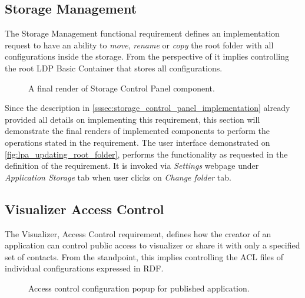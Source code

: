 \subsection{Storage Management}

The Storage Management functional requirement defines an implementation request to have an ability to \textit{move}, \textit{rename} or \textit{copy} the root folder with all configurations inside the storage. From the perspective of \lpas{} it implies controlling the root LDP Basic Container that stores all configurations.

\begin{figure}[h]
\centering
{}
\caption{A final render of Storage Control Panel component.}
\label{fig:lpa_updating_root_folder}
\end{figure}

Since the description in \autoref{sssec:storage_control_panel_implementation} already provided all details on implementing this requirement, this section will demonstrate the final renders of implemented components to perform the operations stated in the requirement. The user interface demonstrated on \autoref{fig:lpa_updating_root_folder}, performs the functionality as requested in the definition of the requirement. It is invoked via \textit{Settings} webpage under \textit{Application Storage} tab when user clicks on \textit{Change folder} tab. 

\subsection{Visualizer Access Control}

The Visualizer, Access Control requirement, defines how the creator of an application can control public access to visualizer or share it with only a specified set of contacts. From the \lpas{} standpoint, this implies controlling the ACL files of individual \lpa{} configurations expressed in RDF.

\begin{figure}[h]
\centering
{}
\caption{Access control configuration popup for published application.}
\label{fig:lpa_access_control_setup}
\end{figure}

